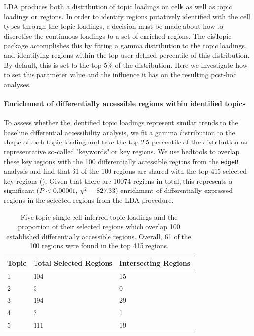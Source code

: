 LDA produces both a distribution of topic loadings on cells as well as topic loadings on regions. In order to identify regions putatively identified with the cell types through the topic loadings, a decision must be made about how to discretise the continuous loadings to a set of enriched regions. The cisTopic package accomplishes this by fitting a gamma distribution to the topic loadings, and identifying regions within the top user-defined percentile of this distribution. By default, this is set to the top 5\% of the distribution. Here we investigate how to set this parameter value and the influence it has on the resulting post-hoc analyses. 



\paragraph{Enrichment of differentially accessible regions within identified topics}

To assess whether the identified topic loadings represent similar trends to the baseline differential accessibility analysis, we fit a gamma distribution to the shape of each topic loading and take the top 2.5 percentile of the distribution as representative so-called "keywords" or key regions. We use bedtools to overlap these key regions with the 100 differentially accessible regions from the {\tt edgeR} analysis and find that 61 of the 100 regions are shared with the top 415 selected key regions (). Given that there are 10074 regions in total, this represents a significant ($P<0.00001$, $\chi^2 = 827.33$) enrichment of differentially expressed regions in the selected regions from the LDA procedure.


\begin{table}
  \centering
  \begin{tabular}{l|l|l}
  Topic & Total Selected Regions & Intersecting Regions  \\ 
  \hline
  1     & 104                    & 15                    \\
  2     & 3                      & 0                     \\
  3     & 194                    & 29                    \\
  4     & 3                      & 1                     \\
  5     & 111                    & 19                   
  \end{tabular}
  \caption{Five topic single cell inferred topic loadings and the proportion of their selected regions which overlap 100 established differentially accessible regions. Overall, 61 of the 100 regions were found in the top 415 regions.}
  \label{table:sc_t5_over}
  \end{table}

